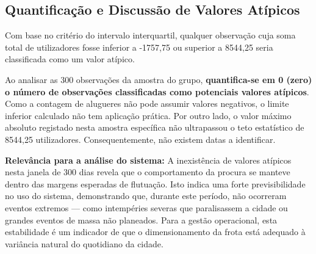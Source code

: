 \documentclass[12pt,a4paper]{article}
\begin{document}
\subsection*{Quantificação e Discussão de Valores Atípicos}
Com base no critério do intervalo interquartil, qualquer observação cuja soma total de utilizadores fosse inferior a -1757,75 ou superior a 8544,25 seria classificada como um valor atípico.

Ao analisar as 300 observações da amostra do grupo, \textbf{quantifica-se em 0 (zero) o número de observações classificadas como potenciais valores atípicos}. Como a contagem de alugueres não pode assumir valores negativos, o limite inferior calculado não tem aplicação prática. Por outro lado, o valor máximo absoluto registado nesta amostra específica não ultrapassou o teto estatístico de 8544,25 utilizadores. Consequentemente, não existem datas a identificar.

\textbf{Relevância para a análise do sistema:}
A inexistência de valores atípicos nesta janela de 300 dias revela que o comportamento da procura se manteve dentro das margens esperadas de flutuação. Isto indica uma forte previsibilidade no uso do sistema, demonstrando que, durante este período, não ocorreram eventos extremos — como intempéries severas que paralisassem a cidade ou grandes eventos de massa não planeados. Para a gestão operacional, esta estabilidade é um indicador de que o dimensionamento da frota está adequado à variância natural do quotidiano da cidade.
\end{document}
